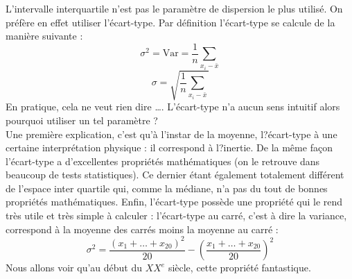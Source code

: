 L'intervalle interquartile n'est pas le paramètre de dispersion le plus utilisé. On préfère en effet utiliser l'écart-type.\newline 
Par définition l'écart-type se calcule de la manière suivante :
$$\sigma^{2} = \textrm{Var} = \frac{1}{n} \sum_{x_{i} -\bar{x}}$$
$$\sigma = \sqrt{ \frac{1}{n} \sum_{x_{i} -\bar{x}}}$$
En pratique, cela ne veut rien dire \dots.
L'écart-type n'a aucun sens intuitif alors pourquoi utiliser un tel paramètre ? \newline
\\
Une première explication, c'est qu'à l'instar de la moyenne, l?écart-type à une certaine interprétation physique : il correspond à l?inertie. De la même façon l'écart-type a d'excellentes propriétés mathématiques (on le retrouve dans beaucoup de tests statistiques). Ce dernier étant également totalement différent de l'espace inter quartile qui, comme la médiane, n'a pas du tout de bonnes propriétés mathématiques.\newline
Enfin, l'écart-type possède une propriété qui le rend très utile et très simple à calculer : l'écart-type au carré, c'est à dire la variance, correspond à la moyenne des carrés moins la moyenne au carré :
$$\sigma^{2} = \frac{(x_{1}+ \dots +x_{20})^{2}}{20} - (\frac{x_{1}+ \dots +x_{20}}{20})^{2}$$
Nous allons voir qu'au début du $XX^{e}$ siècle, cette propriété fantastique.\newline 
